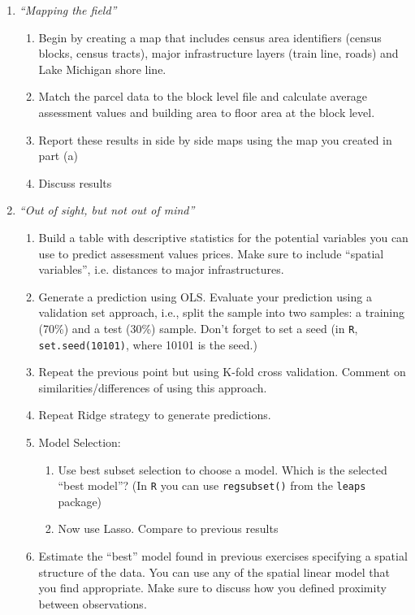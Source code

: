 \documentclass[12pt,onecolumn]{article}
\begin{document}
\begin{enumerate}
  \item {\it ``Mapping the field''}
  \begin{enumerate}
  \item Begin by creating a map that includes census area identifiers (census blocks, census tracts),  major infrastructure layers (train line, roads) and Lake Michigan shore line.
  \item Match the parcel data to the block level file and calculate average assessment values  and building area to floor area at the  block level.
  \item Report these results in side by side maps using the map you created in part (a)
  \item Discuss results
  \end{enumerate}
  \item {\it ``Out of sight, but not out of mind''}
  \begin{enumerate}
    
    \item Build a table with descriptive statistics for the potential variables you can use to predict assessment values prices. Make sure to include ``spatial variables'', i.e. distances to major infrastructures. 
  	\item Generate a prediction using OLS. Evaluate your prediction using a validation set approach, i.e., split the sample into two samples: a training (70\%) and a test (30\%) sample. Don't forget to set a seed (in \texttt{R}, \texttt{set.seed(10101)}, where 10101 is the seed.)  
    \item Repeat the previous point but using K-fold cross validation. Comment on similarities/differences of using this approach.
    \item Repeat Ridge strategy to generate predictions.
    \item Model Selection:
    \begin{enumerate}
      \item Use best subset selection to choose a model. Which is the selected ``best model''? (In \texttt{R} you can use \texttt{regsubset()} from the \texttt{leaps} package)
      \item Now use Lasso. Compare to previous results
    \end{enumerate}  
    \item Estimate the ``best'' model found in previous exercises specifying a spatial structure of the data. You can use any of the spatial linear model that you find appropriate. Make sure to discuss how you defined proximity between observations.




\end{enumerate}
\end{enumerate}
\end{document}
